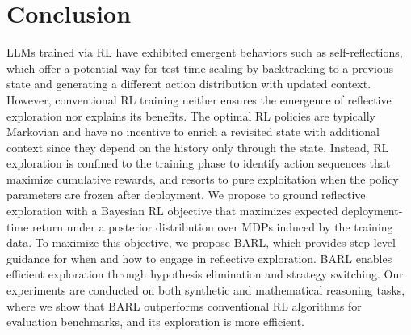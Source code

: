 \section{Conclusion}\label{sec_conclusion}
LLMs trained via RL have exhibited emergent behaviors such as self-reflections, which offer a potential way for test-time scaling by backtracking to a previous state and generating a different action distribution with updated context. However, conventional RL training neither ensures the emergence of reflective exploration nor explains its benefits. The optimal RL policies are typically Markovian and have no incentive to enrich a revisited state with additional context since they depend on the history only through the state. Instead, RL exploration is confined to the training phase to identify action sequences that maximize cumulative rewards, and resorts to pure exploitation when the policy parameters are frozen after deployment. We propose to ground reflective exploration with a Bayesian RL objective that maximizes expected deployment-time return under a posterior distribution over MDPs induced by the training data. To maximize this objective, we propose BARL, which provides step-level guidance for when and how to engage in reflective exploration. BARL enables efficient exploration through hypothesis elimination and strategy switching. Our experiments are conducted on both synthetic and mathematical reasoning tasks, where we show that BARL outperforms conventional RL algorithms for evaluation benchmarks, and its exploration is more efficient. 
